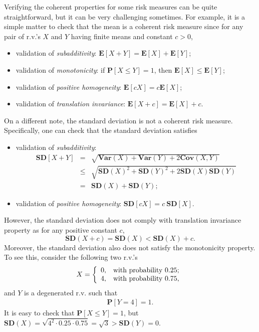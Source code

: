 \documentclass[12pt]{article}
\begin{document}
Verifying the coherent properties for some risk measures can be quite straightforward, but it can be very challenging sometimes.  For example, it is a simple matter to check that the mean is a coherent risk measure since for any pair of r.v.'s $X$ and $Y$ having finite means and constant $c>0$,
\begin{itemize}
  \item validation of \textit{subadditivity}: $\mathbf{E}[X+Y]=\mathbf{E}[X]+\mathbf{E}[Y]$;
  \item validation of \textit{monotonicity}: if $\mathbf{P}[X\leq Y]=1$, then $\mathbf{E}[X]\leq \mathbf{E}[Y]$;
  \item validation of \textit{positive homogeneity}: $\mathbf{E}[cX]=c\mathbf{E}[X]$;
  \item validation of \textit{translation invariance}: $\mathbf{E}[X+c]=\mathbf{E}[X]+c$.
\end{itemize}
On a different note, the standard deviation is not a coherent risk measure.  Specifically, one can check that the standard deviation satisfies
\begin{itemize}
  \item validation of \textit{subadditivity}: \begin{eqnarray*} \mathbf{SD}[X+Y]&=&\sqrt{\mathbf{Var}(X)+\mathbf{Var}(Y)+2\mathbf{Cov}(X,Y)}\\
      &\leq& \sqrt{\mathbf{SD}(X)^2+\mathbf{SD}(Y)^2+2\mathbf{SD}(X)\mathbf{SD}(Y)}\\
      &=& \mathbf{SD}(X)+\mathbf{SD}(Y);
      \end{eqnarray*}
  \item validation of \textit{positive homogeneity}: $\mathbf{SD}[cX]=c~\mathbf{SD}[X]$.
\end{itemize}
However, the standard deviation does not comply with translation invariance property as for any positive constant $c$, \[
\mathbf{SD}(X+c)=\mathbf{SD}(X)<\mathbf{SD}(X)+c.
\]
Moreover, the standard deviation also does not satisfy the monotonicity property.  To see this, consider the following two r.v.'s
\begin{eqnarray}
\label{eqn:special_x}
X=\left\{
    \begin{array}{ll}
      0, & \hbox{with probability $0.25$;} \\
      4, & \hbox{with probability $0.75$,}
    \end{array}
  \right.
\end{eqnarray}
and $Y$ is a degenerated r.v. such that
\begin{eqnarray}
\label{eqn:special_y}
\mathbf{P}[Y=4]=1.
\end{eqnarray}  It is easy to check that
$\mathbf{P}[X\leq Y]=1$, but $\mathbf{SD}(X)=\sqrt{4^2\cdot 0.25\cdot 0.75}=\sqrt{3}>\mathbf{SD}(Y)=0$.
\end{document}
